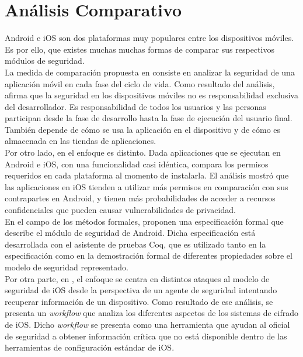 \chapter{Análisis Comparativo}
Android e iOS son dos plataformas muy populares entre los dispositivos móviles. Es por ello, que existes muchas  muchas formas de comparar sus respectivos módulos de seguridad.\\

La medida de comparación propuesta en \cite{YA2014} consiste en analizar la seguridad de una aplicación móvil en cada fase del ciclo de vida. Como resultado del análisis, afirma que la seguridad en los dispositivos móviles no es responsabilidad exclusiva del desarrollador. Es responsabilidad de todos los usuarios y las personas participan desde la fase de desarrollo hasta la fase de ejecución del usuario final. También depende de cómo se usa la aplicación en el dispositivo y de cómo es almacenada en las tiendas de aplicaciones.\\

Por otro lado, en \cite{HYGZD13} el enfoque es distinto. Dada aplicaciones que se ejecutan en Android e iOS, con una funcionalidad casi idéntica, compara los permisos requeridos en cada plataforma al momento de instalarla. El análisis mostró que las aplicaciones en iOS tienden a utilizar más permisos en comparación con sus contrapartes en Android, y tienen más probabilidades de acceder a recursos confidenciales que pueden causar vulnerabilidades de privacidad.\\

En el campo de los métodos formales, \cite{Gor16, BCLR15, Rom14} proponen una especificación formal que describe el módulo de seguridad de Android. Dicha especificación está desarrollada con el asistente de pruebas Coq, que es utilizado tanto en la especificación como en la demostración formal de diferentes propiedades sobre el modelo de seguridad representado.\\

Por otra parte, en \cite{TZSH13}, el enfoque se centra en distintos ataques al modelo de seguridad de iOS desde la perspectiva de un agente de seguridad intentando recuperar información de un dispositivo. Como resultado de ese análisis, se presenta un \emph{workflow} que analiza los diferentes aspectos de los sistemas de cifrado de iOS. Dicho \emph{workflow} se presenta como una herramienta que ayudan al oficial de seguridad a obtener información crítica que no está disponible dentro de las herramientas de configuración estándar de iOS.\\

